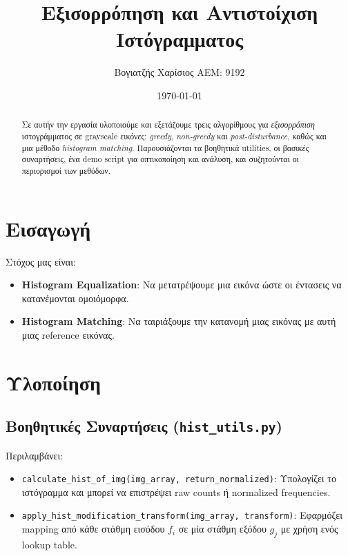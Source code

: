 \documentclass{article}
\title{Εξισορρόπηση και Αντιστοίχιση Ιστόγραμματος}
\author{Βογιατζής Χαρίσιος ΑΕΜ: 9192}
\date{\today}
\begin{document}
\maketitle

\begin{abstract}
Σε αυτήν την εργασία υλοποιούμε και εξετάζουμε τρεις αλγορίθμους
για \emph{εξισορρόπιση} ιστογράμματος σε grayscale εικόνες:
\emph{greedy}, \emph{non-greedy} και \emph{post-disturbance}, καθώς
και μια μέθοδο \emph{histogram matching}. Παρουσιάζονται τα βοηθητικά
utilities, οι βασικές συναρτήσεις, ένα demo script για οπτικοποίηση και
ανάλυση, και συζητούνται οι περιορισμοί των μεθόδων.
\end{abstract}

\section{Εισαγωγή}
Στόχος μας είναι:
\begin{itemize}
  \item \textbf{Histogram Equalization}: Να μετατρέψουμε μια εικόνα ώστε
  οι έντασεις να κατανέμονται ομοιόμορφα.
  \item \textbf{Histogram Matching}: Να ταιριάξουμε την κατανομή μιας εικόνας
  με αυτή μιας reference εικόνας.
\end{itemize}

\section{Υλοποίηση}

\subsection{Βοηθητικές Συναρτήσεις (\texttt{hist\_utils.py})}
Περιλαμβάνει:
\begin{itemize}
  \item \texttt{calculate\_hist\_of\_img(img\_array, return\_normalized)}:
    Υπολογίζει το ιστόγραμμα και μπορεί να επιστρέψει raw counts
    ή normalized frequencies.
  \item \texttt{apply\_hist\_modification\_transform(img\_array, transform)}:
    Εφαρμόζει mapping από κάθε στάθμη εισόδου \(f_i\) σε μία στάθμη εξόδου \(g_j\)
    με χρήση ενός lookup table.
\end{itemize}
\end{document}
